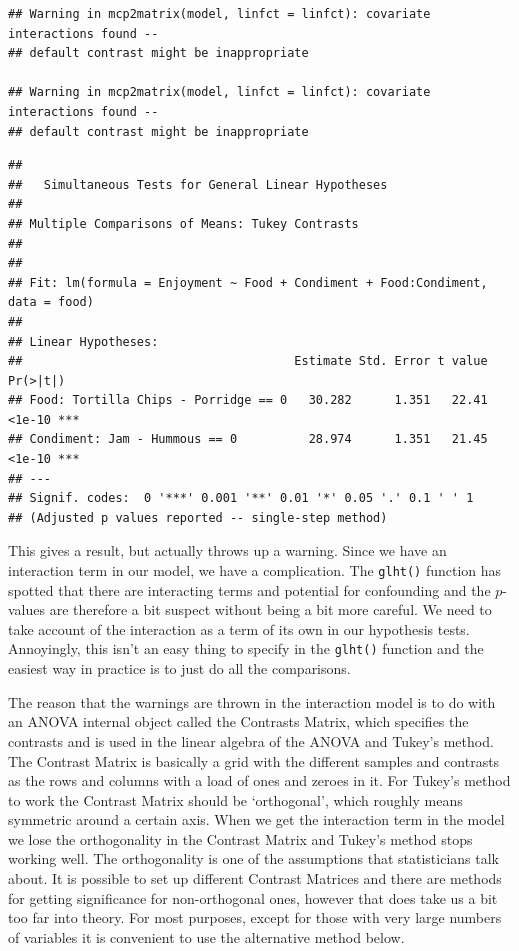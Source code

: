 \documentclass[
]{book}
\newenvironment{sidenote}
{ \begin{tcolorbox}[colbacktitle=blue!50!white,
title=huh?,coltitle=white,
fonttitle=\bfseries] }
{  \end{tcolorbox} }
\begin{document}
\begin{verbatim}
## Warning in mcp2matrix(model, linfct = linfct): covariate interactions found --
## default contrast might be inappropriate

## Warning in mcp2matrix(model, linfct = linfct): covariate interactions found --
## default contrast might be inappropriate
\end{verbatim}

\begin{verbatim}
## 
## 	 Simultaneous Tests for General Linear Hypotheses
## 
## Multiple Comparisons of Means: Tukey Contrasts
## 
## 
## Fit: lm(formula = Enjoyment ~ Food + Condiment + Food:Condiment, data = food)
## 
## Linear Hypotheses:
##                                      Estimate Std. Error t value Pr(>|t|)    
## Food: Tortilla Chips - Porridge == 0   30.282      1.351   22.41   <1e-10 ***
## Condiment: Jam - Hummous == 0          28.974      1.351   21.45   <1e-10 ***
## ---
## Signif. codes:  0 '***' 0.001 '**' 0.01 '*' 0.05 '.' 0.1 ' ' 1
## (Adjusted p values reported -- single-step method)
\end{verbatim}

This gives a result, but actually throws up a warning. Since we have an interaction term in our model, we have a complication. The \texttt{glht()} function has spotted that there are interacting terms and potential for confounding and the \(p\)-values are therefore a bit suspect without being a bit more careful. We need to take account of the interaction as a term of its own in our hypothesis tests. Annoyingly, this isn't an easy thing to specify in the \texttt{glht()} function and the easiest way in practice is to just do all the comparisons.

\begin{sidenote}
The reason that the warnings are thrown in the interaction model is to do with an ANOVA internal object called the Contrasts Matrix, which specifies the contrasts and is used in the linear algebra of the ANOVA and Tukey's method. The Contrast Matrix is basically a grid with the different samples and contrasts as the rows and columns with a load of ones and zeroes in it. For Tukey's method to work the Contrast Matrix should be `orthogonal', which roughly means symmetric around a certain axis. When we get the interaction term in the model we lose the orthogonality in the Contrast Matrix and Tukey's method stops working well. The orthogonality is one of the assumptions that statisticians talk about. It is possible to set up different Contrast Matrices and there are methods for getting significance for non-orthogonal ones, however that does take us a bit too far into theory. For most purposes, except for those with very large numbers of variables it is convenient to use the alternative method below.
\end{sidenote}
\end{document}
